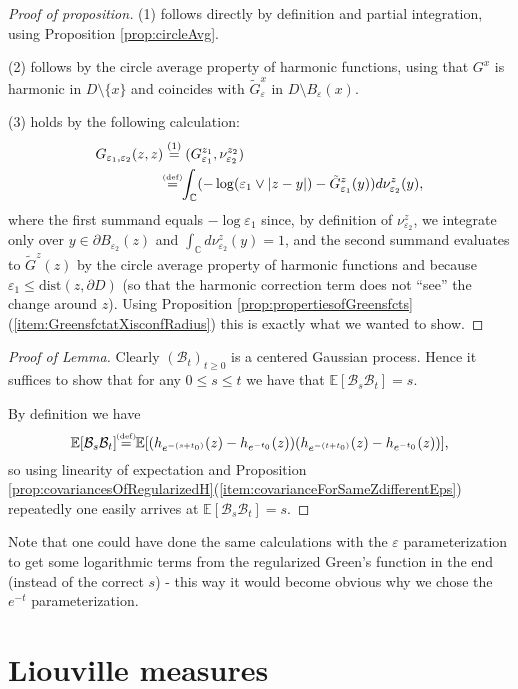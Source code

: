 \documentclass[11pt,reqno]{amsart}
\numberwithin{equation}{section}
\newcommand{\eqby}[1]{\mathrel{\stackrel{#1}{=}}}
\newcommand{\eqbydef}{\mathrel{\stackrel{\hspace*{-3mm}\text{\tiny(def)}\hspace*{-3mm}}{=}}}
\newcommand{\eps}{\varepsilon}
\begin{document}
\begin{proof}[Proof of proposition]
	(1) follows directly by definition and partial integration, using Proposition \ref{prop:circleAvg}.
	
	(2) follows by the circle average property of harmonic functions, using that $G^x$ is harmonic in $D\setminus\{x\}$ and coincides with $\tilde G^x_\eps$ in $D\setminus B_\eps(x)$.
	
	(3) holds by the following calculation:
	\begin{align*}
		G_{\eps_1,\eps_2}(z,z)&\eqby{(1)}(G_{\eps_1}^{z_1},\nu_{\eps_2}^{z_2})\\
		&\eqbydef \int_\mathbb{C}(-\log(\eps_1\vee |z-y|)-\tilde G_{\eps_1}^z(y))d\nu_{\eps_2}^z(y),
	\end{align*}
	where the first summand equals $-\log\eps_1$ since, by definition of $\nu_{\eps_2}^z$, we integrate only over $y\in\partial B_{\eps_2}(z)$ and $\int_\mathbb{C}d\nu_{\eps_2}^z(y)=1$, and the second summand evaluates to $\tilde G^z(z)$ by the circle average property of harmonic functions and because $\eps_1\leq\text{dist}(z,\partial D)$ (so that the harmonic correction term does not ``see'' the change around $z$). Using Proposition \ref{prop:propertiesofGreensfcts}(\ref{item:GreensfctatXisconfRadius}) this is exactly what we wanted to show.
\end{proof}

\begin{proof}[Proof of Lemma]
	Clearly $(\mathcal B_t)_{t\geq 0}$ is a centered Gaussian process. Hence it suffices to show that for any $0\leq s\leq t$ we have that $\mathbb E[\mathcal B_s\mathcal B_t] = s$. 
	
	By definition we have $$\mathbb E[\mathcal B_s\mathcal B_t]\eqbydef \mathbb E[(h_{e^{-(s+t_0)}}(z)-h_{e^{-t_0}}(z))(h_{e^{-(t+t_0)}}(z)-h_{e^{-t_0}}(z))],$$ so using linearity of expectation and Proposition \ref{prop:covariancesOfRegularizedH}(\ref{item:covarianceForSameZdifferentEps}) repeatedly one easily arrives at $\mathbb E[\mathcal B_s\mathcal B_t] = s$.
\end{proof}

Note that one could have done the same calculations with the $\eps$ parameterization to get some logarithmic terms from the regularized Green's function in the end (instead of the correct $s$) - this way it would become obvious why we chose the $e^{-t}$ parameterization.

\section{Liouville measures}
\end{document}

